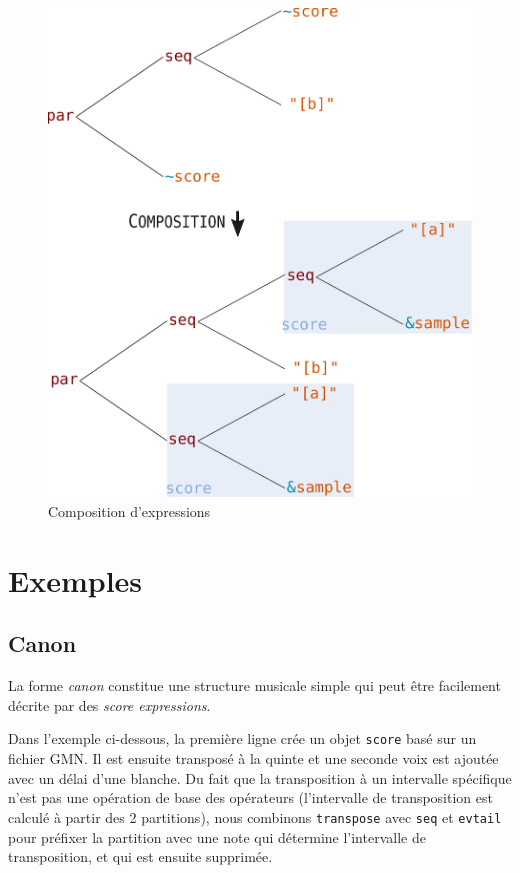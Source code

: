 \documentclass{article}
\newcommand{\OSC}[1]	{{\fontsize{10pt}{10pt} \selectfont\texttt{#1}}}
\newcommand{\sExprs}{\emph{score expressions}}
\begin{document}
\begin{figure}[th]
\centering
\includegraphics[width=0.9\columnwidth]{imgs/expandingTree}
\caption{Composition d'expressions
\label{fig:expandingTree}}
\end{figure}

\section{Exemples}
\label{examples}

\subsection{Canon}

La forme \emph{canon} constitue une structure musicale simple qui peut être facilement décrite par des \sExprs.

Dans l'exemple ci-dessous, la première ligne crée un objet \OSC{score} basé sur un fichier GMN. Il est ensuite transposé à la quinte et une seconde voix est ajoutée avec un délai d'une blanche. Du fait que la transposition à un intervalle spécifique n'est pas une opération de base des opérateurs (l'intervalle de transposition est calculé à partir des 2 partitions), nous combinons \OSC{transpose} avec \OSC{seq} et \OSC{evtail} pour préfixer la partition avec une note qui détermine l'intervalle de transposition, et qui est ensuite supprimée.
\end{document}
